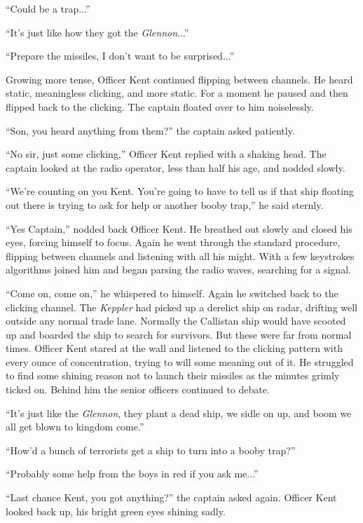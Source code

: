\documentclass[openany, 12pt]{book} %
\begin{document}
``Could be a trap...''

``It's just like how they got the \textit{\textit{Glennon}}...''

``Prepare the missiles, I don't want to be surprised...''

Growing more tense, Officer Kent continued flipping between channels. He heard static, meaningless clicking, and more static. For a moment he paused and then flipped back to the clicking. The captain floated over to him noiselessly.

``Son, you heard anything from them?'' the captain asked patiently.

``No sir, just some clicking,'' Officer Kent replied with a shaking head. The captain looked at the radio operator, less than half his age, and nodded slowly.

``We're counting on you Kent. You're going to have to tell us if that ship floating out there is trying to ask for help or another booby trap,'' he said sternly.

``Yes Captain,'' nodded back Officer Kent. He breathed out slowly and closed his eyes, forcing himself to focus. Again he went through the standard procedure, flipping between channels and listening with all his might. With a few keystrokes algorithms joined him and began parsing the radio waves, searching for a signal.

``Come on, come on,'' he whispered to himself. Again he switched back to the clicking channel. The \textit{Keppler} had picked up a derelict ship on radar, drifting well outside any normal trade lane. Normally the Callistan ship would have scooted up and boarded the ship to search for survivors. But these were far from normal times. Officer Kent stared at the wall and listened to the clicking pattern with every ounce of concentration, trying to will some meaning out of it. He struggled to find some shining reason not to launch their missiles as the minutes grimly ticked on. Behind him the senior officers continued to debate.

``It's just like the \textit{Glennon}, they plant a dead ship, we sidle on up, and boom we all get blown to kingdom come.''

``How'd a bunch of terrorists get a ship to turn into a booby trap?''

``Probably some help from the boys in red if you ask me...''

``Last chance Kent, you got anything?'' the captain asked again. Officer Kent looked back up, his bright green eyes shining sadly.
\end{document}

